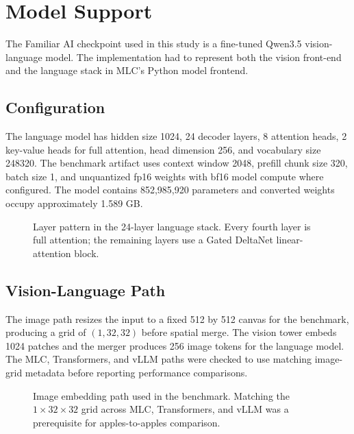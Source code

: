 \documentclass[10pt]{article}
\begin{document}
\section{Model Support}

The Familiar AI checkpoint used in this study is a fine-tuned Qwen3.5
vision-language model. The implementation had to represent both the vision
front-end and the language stack in MLC's Python model frontend.

\subsection{Configuration}

The language model has hidden size 1024, 24 decoder layers, 8 attention heads,
2 key-value heads for full attention, head dimension 256, and vocabulary size
248320. The benchmark artifact uses context window 2048, prefill chunk size
320, batch size 1, and unquantized fp16 weights with bf16 model compute where
configured. The model contains 852,985,920 parameters and converted weights
occupy approximately 1.589 GB.

\begin{figure}[t]
  \centering
  
  \caption{Layer pattern in the 24-layer language stack. Every fourth layer is
  full attention; the remaining layers use a Gated DeltaNet linear-attention
  block.}
  \label{fig:model-structure}
\end{figure}

\subsection{Vision-Language Path}

The image path resizes the input to a fixed 512 by 512 canvas for the benchmark,
producing a grid of $(1,32,32)$ before spatial merge. The vision tower embeds
1024 patches and the merger produces 256 image tokens for the language model.
The MLC, Transformers, and vLLM paths were checked to use matching image-grid
metadata before reporting performance comparisons.

\begin{figure}[t]
  \centering
  
  \caption{Image embedding path used in the benchmark. Matching the
  $1 \times 32 \times 32$ grid across MLC, Transformers, and vLLM was a
  prerequisite for apples-to-apples comparison.}
  \label{fig:image-path}
\end{figure}
\end{document}
